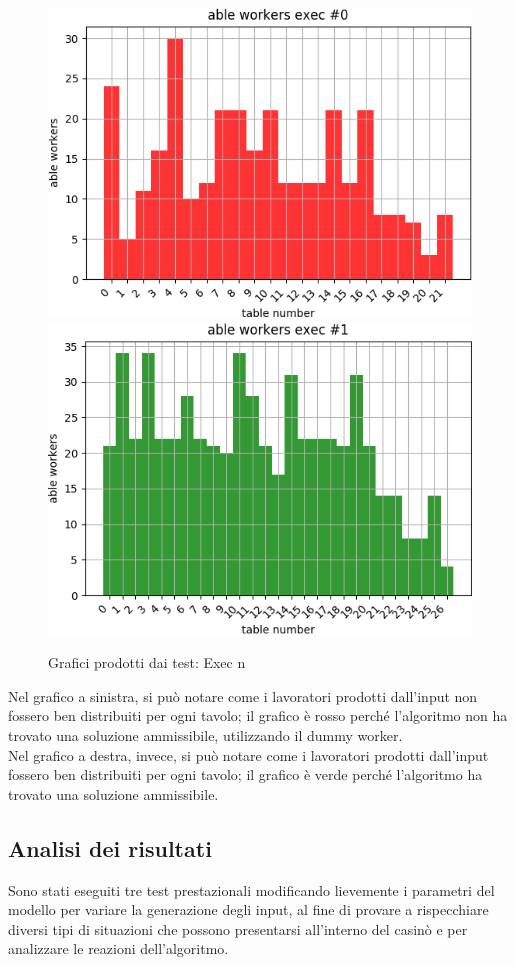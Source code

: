     \begin{figure}[!h]
        \begin{widepage}
            \centering
            \includegraphics[width=.47\textwidth]{../immagini/exec_0.png}\hfil
            \includegraphics[width=.47\textwidth]{../immagini/exec_1.png}
            \caption{Grafici prodotti dai test: Exec n}
        \end{widepage}
    \end{figure}
    \FloatBarrier
    \noindent
    Nel grafico a sinistra, si può notare come i lavoratori prodotti dall’input non fossero ben distribuiti per ogni tavolo; il grafico è rosso perché l’algoritmo non ha trovato una soluzione ammissibile, utilizzando il dummy worker.\\
    Nel grafico a destra, invece, si può notare come i lavoratori prodotti dall’input fossero ben distribuiti per ogni tavolo; il grafico è verde perché l’algoritmo ha trovato una soluzione ammissibile.
   
   \subsection{Analisi dei risultati}
   Sono stati eseguiti tre test prestazionali modificando lievemente i parametri del modello per variare la generazione degli input, al fine di provare a rispecchiare diversi tipi di situazioni che possono presentarsi all'interno del casinò e per analizzare le reazioni dell'algoritmo.
